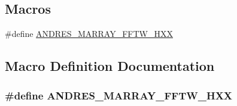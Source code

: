 \subsection*{Macros}
\begin{DoxyCompactItemize}
\item 
\#define \hyperlink{marray-fftw_8hxx_ae1a77a5da5a70854727f1cef07f35e7f}{A\+N\+D\+R\+E\+S\+\_\+\+M\+A\+R\+R\+A\+Y\+\_\+\+F\+F\+T\+W\+\_\+\+H\+X\+X}
\end{DoxyCompactItemize}


\subsection{Macro Definition Documentation}
\hypertarget{marray-fftw_8hxx_ae1a77a5da5a70854727f1cef07f35e7f}{}
\subsubsection[{A\+N\+D\+R\+E\+S\+\_\+\+M\+A\+R\+R\+A\+Y\+\_\+\+F\+F\+T\+W\+\_\+\+H\+X\+X}]{\setlength{\rightskip}{0pt plus 5cm}\#define A\+N\+D\+R\+E\+S\+\_\+\+M\+A\+R\+R\+A\+Y\+\_\+\+F\+F\+T\+W\+\_\+\+H\+X\+X}\label{marray-fftw_8hxx_ae1a77a5da5a70854727f1cef07f35e7f}

